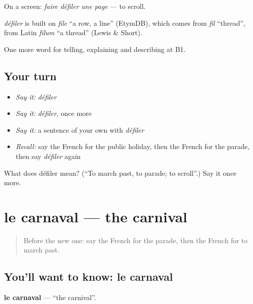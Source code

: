 On a screen: \emph{faire défiler une page} — to scroll.

\begin{cousinweb}
\emph{défiler} is built on \emph{file} \textquotedblleft{}a row, a line\textquotedblright{} (EtymDB), which comes from \emph{fil} \textquotedblleft{}thread\textquotedblright{}, from Latin \emph{fīlum} \textquotedblleft{}a thread\textquotedblright{} (Lewis \& Short).
\end{cousinweb}

\begin{grammarlens}[title={What you've built}]
One more word for telling, explaining and describing at B1.
\end{grammarlens}

\subsection*{Your turn}
\begin{itemize}
\raggedright
  \item \emph{Say it:} \emph{défiler}
  \item \emph{Say it:} \emph{défiler}, once more
  \item \emph{Say it:} a sentence of your own with \emph{défiler}
  \item \emph{Recall:} say the French for the public holiday, then the French for the parade, then say \emph{défiler} again
\end{itemize}

\begin{tcolorbox}[breakable,colback=teal!4,colframe=teal!35!black,title={Before you move on}]
What does défiler mean? (\textquotedblleft{}To march past, to parade; to scroll\textquotedblright{}.) Say it once more.
\end{tcolorbox}
\section[le carnaval]{le carnaval — the carnival}

\label{lesson:FR-C317-carnaval}



\begin{quote}
Before the new one: say the French for the parade, then the French for to march past.
\end{quote}

\subsection*{You'll want to know: le carnaval}
\textbf{le carnaval} — \textquotedblleft{}the carnival\textquotedblright{}.

